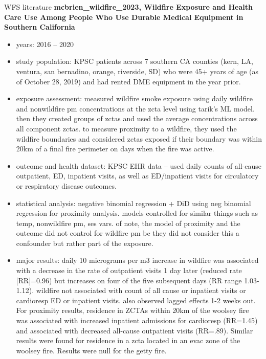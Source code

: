 WFS literature
\citep{mcbrien_wildfire_2023, elser2025wildfire, cleland2022short, gould2024health, aguilera2021wildfire, wettstein2024psychotropic, chen2023emergency, jung2025fine}
\textbf{mcbrien_wildfire_2023, Wildfire Exposure and Health Care Use Among People Who Use Durable Medical Equipment in Southern California}
\begin{itemize}
    \item years: 2016 -- 2020
    \item study population: KPSC patients across 7 southern CA counties (kern, LA, ventura, san bernadino, orange, riverside, SD) who were 45+ years of age (as of October 28, 2019) and had rented DME equipment in the year prior. 
    \item exposure assessment: measured wildfire smoke exposure using daily wildfire and nonwildfire pm concentrations at the zcta level using tarik's ML model. then they created groups of zctas and used the average concentrations across all component zctas. to measure proximity to a wildfire, they used the wildfire boundaries and considered zctas exposed if their boundary was within 20km of a final fire perimeter on days when the fire was active. 
    \item outcome and health dataset: KPSC EHR data -- used daily counts of all-cause outpatient, ED, inpatient visits, as well as ED/inpatient visits for circulatory or respiratory disease outcomes. 
    \item statistical analysis: negative binomial regression + DiD using neg binomial regression for proximity analysis. models controlled for similar things such as temp, nonwildfire pm, ses vars. of note, the model of proximity and the outcome did not control for wildfire pm bc they did not consider this a confounder but rather part of the exposure. 
    \item major results: daily 10 micrograms per m3 increase in wildfire \PM was associated with a decrease in the rate of outpatient visits 1 day later (reduced rate [RR]=0.96) but increases on four of the five subsequent days (RR range 1.03-1.12). wildfire \PM not associated with count of all cause or inpatient visits or cardioresp ED or inpatient visits. also observed lagged effects 1-2 weeks out. For proximity results, residence in ZCTAs within 20km of the woolsey fire was associated with increased inpatient admissions for cardioresp (RR=1.45) and associated with decreased all-cause outpatient visits (RR=.89). Similar results were found for residence in a zcta located in an evac zone of the woolsey fire. Results were null for the getty fire. 
\end{itemize}

